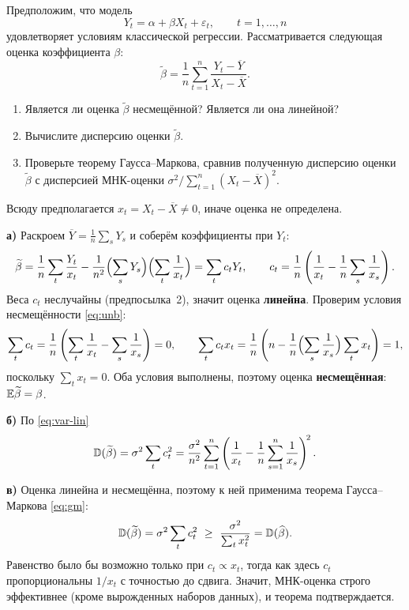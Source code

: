 
Предположим, что модель
\[
  Y_t = \alpha + \beta X_t + \varepsilon_t, \qquad t = 1,\dots,n
\]
удовлетворяет условиям классической регрессии. Рассматривается следующая оценка
коэффициента $\beta$:
\[
  \widetilde{\beta} = \frac{1}{n}\sum_{t=1}^{n} \frac{Y_t - \overline{Y}}{X_t - \overline{X}} .
\]
\begin{enumerate}[label=\asbuk*), leftmargin=2.2em, itemsep=3pt]
  \item Является ли оценка $\widetilde{\beta}$ несмещённой? Является ли она линейной?
  \item Вычислите дисперсию оценки $\widetilde{\beta}$.
  \item Проверьте теорему Гаусса--Маркова, сравнив полученную дисперсию оценки
        $\widetilde{\beta}$ с дисперсией МНК-оценки
        $\sigma^2\big/\sum_{t=1}^{n}(X_t - \overline{X})^2$.
\end{enumerate}

\begin{solution}
Всюду предполагается $x_t = X_t - \overline{X} \neq 0$, иначе оценка не
определена.

\medskip
\textbf{а)} Раскроем $\overline{Y} = \frac{1}{n}\sum_s Y_s$ и соберём
коэффициенты при $Y_t$:
\[
  \widetilde{\beta}
  = \frac{1}{n}\sum_t \frac{Y_t}{x_t}
    - \frac{1}{n^2}\Bigl(\sum_s Y_s\Bigr)\Bigl(\sum_t \frac{1}{x_t}\Bigr)
  = \sum_t c_tY_t,
  \qquad
  c_t = \frac{1}{n}\left(\frac{1}{x_t} - \frac{1}{n}\sum_s \frac{1}{x_s}\right).
\]
Веса $c_t$ неслучайны (предпосылка~2), значит оценка \textbf{линейна}. Проверим
условия несмещённости \eqref{eq:unb}:
\[
  \sum_t c_t = \frac{1}{n}\left(\sum_t\frac{1}{x_t} - \sum_s\frac{1}{x_s}\right) = 0,
  \qquad
  \sum_t c_tx_t
  = \frac{1}{n}\left(n - \frac{1}{n}\Bigl(\sum_s\frac{1}{x_s}\Bigr)\sum_t x_t\right)
  = 1,
\]
поскольку $\sum_t x_t = 0$. Оба условия выполнены, поэтому оценка
\textbf{несмещённая}: $\mathbb{E}\widetilde{\beta} = \beta$.

\medskip
\textbf{б)} По \eqref{eq:var-lin}
\[
  \mathbb{D}(\widetilde{\beta}) = \sigma^2\sum_t c_t^2
  = \frac{\sigma^2}{n^2}\sum_{t=1}^{n}
    \left(\frac{1}{x_t} - \frac{1}{n}\sum_{s=1}^{n}\frac{1}{x_s}\right)^{\!2}.
\]

\medskip
\textbf{в)} Оценка линейна и несмещённа, поэтому к ней применима теорема
Гаусса--Маркова \eqref{eq:gm}:
\[
  \D(\widetilde{\beta}) = \sigma^2\sum_t c_t^2 \ \ge\ \frac{\sigma^2}{\sum_t x_t^2}
  = \D(\bh).
\]
Равенство было бы возможно только при $c_t \propto x_t$, тогда как здесь
$c_t$ пропорциональны $1/x_t$ с точностью до сдвига. Значит, МНК-оценка строго
эффективнее (кроме вырожденных наборов данных), и теорема подтверждается.
\end{solution}

